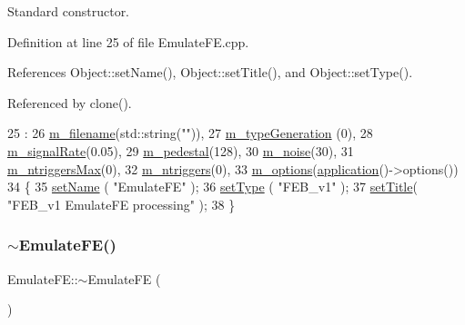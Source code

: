 Standard constructor. 



Definition at line 25 of file Emulate\+F\+E.\+cpp.



References Object\+::set\+Name(), Object\+::set\+Title(), and Object\+::set\+Type().



Referenced by clone().


\begin{DoxyCode}
25                        :
26   \hyperlink{classEmulateFE_a103fedea9eb5d3963573f9120cb81a68}{m\_filename}(std::string(\textcolor{stringliteral}{""})),
27   \hyperlink{classEmulateFE_aa8bd0aa42cc5f3d52930408807b3067c}{m\_typeGeneration} (0),
28   \hyperlink{classEmulateFE_a7aeff9e62f850ca6d7ee27dce02a060b}{m\_signalRate}(0.05),
29   \hyperlink{classEmulateFE_a033996ce759c11305395ac865a6c074a}{m\_pedestal}(128),
30   \hyperlink{classEmulateFE_a74f8720a1da5806fad3811339ef9b98f}{m\_noise}(30),
31   \hyperlink{classEmulateFE_a2d473d12faf30f4870458874d70c7f55}{m\_ntriggersMax}(0),
32   \hyperlink{classEmulateFE_a8df57e3d66bde60e9a79cb2ae54a9f4a}{m\_ntriggers}(0),
33   \hyperlink{classEmulateFE_a2f2da7d4b2164c47673a6ecc6dcef1ea}{m\_options}(\hyperlink{Tools_8h_a27885a3c35afe79029fb830f32f66458}{application}()->options())
34 \{
35   \hyperlink{classObject_ae30fea75683c2d149b6b6d17c09ecd0c}{setName} ( \textcolor{stringliteral}{"EmulateFE"} );
36   \hyperlink{classObject_aae534cc9d982bcb9b99fd505f2e103a5}{setType} ( \textcolor{stringliteral}{"FEB\_v1"} );
37   \hyperlink{classObject_a89557dbbad5bcaa02652f5d7fa35d20f}{setTitle}( \textcolor{stringliteral}{"FEB\_v1 EmulateFE processing"} );
38 \}
\end{DoxyCode}
\mbox{\label{classEmulateFE_ab0ae9c65e546ec89bb0d6d318428d578}} 
\subsubsection{\texorpdfstring{$\sim$\+Emulate\+F\+E()}{~EmulateFE()}}
{\footnotesize\ttfamily Emulate\+F\+E\+::$\sim$\+Emulate\+FE (\begin{DoxyParamCaption}{ }\end{DoxyParamCaption})\hspace{0.3cm}{\ttfamily [virtual]}}



